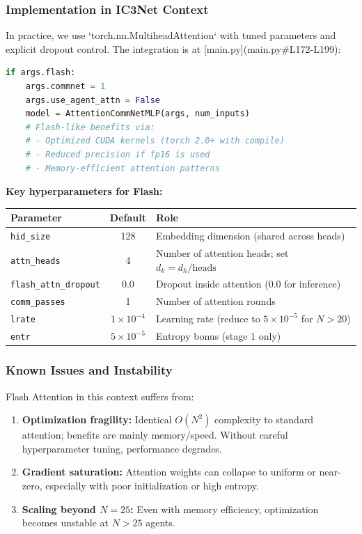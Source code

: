 \subsubsection{Implementation in IC3Net Context}

In practice, we use `torch.nn.MultiheadAttention` with tuned parameters and explicit dropout control. The integration is at [main.py](main.py#L172-L199):

\begin{lstlisting}[language=Python, basicstyle=\small]
if args.flash:
    args.commnet = 1
    args.use_agent_attn = False
    model = AttentionCommNetMLP(args, num_inputs)
    # Flash-like benefits via:
    # - Optimized CUDA kernels (torch 2.0+ with compile)
    # - Reduced precision if fp16 is used
    # - Memory-efficient attention patterns
\end{lstlisting}

\textbf{Key hyperparameters for Flash:}
\begin{table}[h]
\centering
\begin{tabular}{|l|c|l|}
\hline
\textbf{Parameter} & \textbf{Default} & \textbf{Role} \\
\hline
\texttt{hid\_size} & 128 & Embedding dimension (shared across heads) \\
\texttt{attn\_heads} & 4 & Number of attention heads; set $d_k = d_h / \text{heads}$ \\
\texttt{flash\_attn\_dropout} & 0.0 & Dropout inside attention (0.0 for inference) \\
\texttt{comm\_passes} & 1 & Number of attention rounds \\
\texttt{lrate} & $1 \times 10^{-4}$ & Learning rate (reduce to $5 \times 10^{-5}$ for $N > 20$) \\
\texttt{entr} & $5 \times 10^{-5}$ & Entropy bonus (stage 1 only) \\
\hline
\end{tabular}
\end{table}

\subsubsection{Known Issues and Instability}

Flash Attention in this context suffers from:
\begin{enumerate}
    \item \textbf{Optimization fragility:} Identical $O(N^2)$ complexity to standard attention; benefits are mainly memory/speed. Without careful hyperparameter tuning, performance degrades.
    \item \textbf{Gradient saturation:} Attention weights can collapse to uniform or near-zero, especially with poor initialization or high entropy.
    \item \textbf{Scaling beyond $N=25$:} Even with memory efficiency, optimization becomes unstable at $N > 25$ agents.
\end{enumerate}

